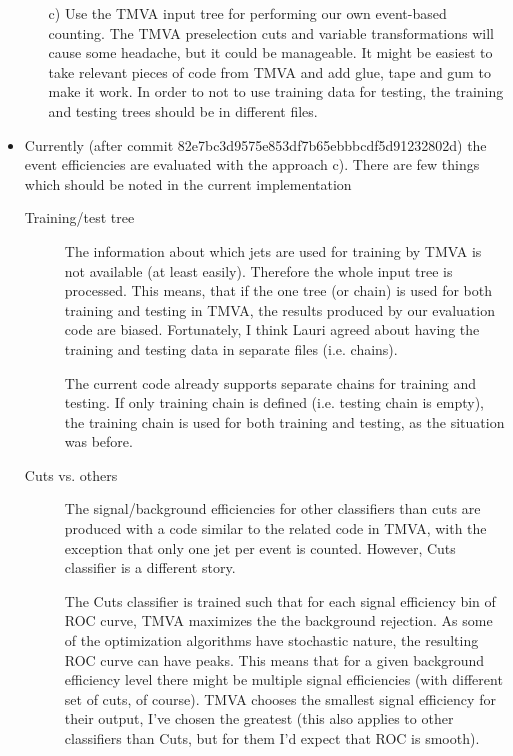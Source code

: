 \begin{itemize}
\begin{enumerate}
  \item[c)] Use the TMVA input tree for performing our own event-based
    counting. The TMVA preselection cuts and variable transformations
    will cause some headache, but it could be manageable. It might be
    easiest to take relevant pieces of code from TMVA and add glue,
    tape and gum to make it work. In order to not to use training data
    for testing, the training and testing trees should be in different
    files.
  \end{enumerate}
\item Currently (after commit
  82e7bc3d9575e853df7b65ebbbcdf5d91232802d) the event efficiencies are
  evaluated with the approach c). There are few things which should be
  noted in the current implementation
  \begin{description}
  \item[Training/test tree] The information about which jets are used
    for training by TMVA is not available (at least easily). Therefore
    the whole input tree is processed. This means, that if the one
    tree (or chain) is used for both training and testing in TMVA, the
    results produced by our evaluation code are biased. Fortunately, I
    think Lauri agreed about having the training and testing data in
    separate files (i.e. chains).

    The current code already supports separate chains for training and
    testing. If only training chain is defined (i.e. testing chain is
    empty), the training chain is used for both training and testing,
    as the situation was before.

  \item[Cuts vs. others] The signal/background efficiencies for other
    classifiers than cuts are produced with a code similar to the
    related code in TMVA, with the exception that only one jet per
    event is counted. However, Cuts classifier is a different story.

    The Cuts classifier is trained such that for each signal
    efficiency bin of ROC curve, TMVA maximizes the the background
    rejection. As some of the optimization algorithms have stochastic
    nature, the resulting ROC curve can have peaks. This means that
    for a given background efficiency level there might be multiple
    signal efficiencies (with different set of cuts, of course). TMVA
    chooses the smallest signal efficiency for their output, I've
    chosen the greatest (this also applies to other classifiers than
    Cuts, but for them I'd expect that ROC is smooth).


\end{description}
\end{itemize}
